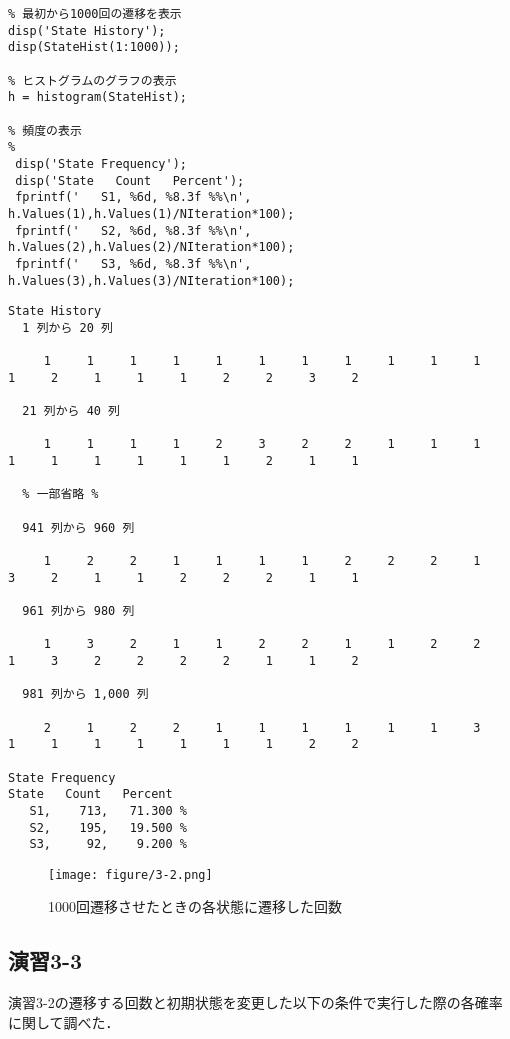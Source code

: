 \documentclass[documentclass]{jsarticle}
\begin{document}
\begin{lstlisting}[caption=1000回遷移させるためのプログラム]
%% Evaluation
% 最初から1000回の遷移を表示
disp('State History');
disp(StateHist(1:1000));

% ヒストグラムのグラフの表示
h = histogram(StateHist);

% 頻度の表示
%
 disp('State Frequency');
 disp('State   Count   Percent');
 fprintf('   S1, %6d, %8.3f %%\n', h.Values(1),h.Values(1)/NIteration*100);
 fprintf('   S2, %6d, %8.3f %%\n', h.Values(2),h.Values(2)/NIteration*100);
 fprintf('   S3, %6d, %8.3f %%\n', h.Values(3),h.Values(3)/NIteration*100);

\end{lstlisting}

\begin{lstlisting}[caption=ソースコード5を実行した際の結果]
  State History
  1 列から 20 列

     1     1     1     1     1     1     1     1     1     1     1     1     2     1     1     1     2     2     3     2

  21 列から 40 列

     1     1     1     1     2     3     2     2     1     1     1     1     1     1     1     1     1     2     1     1

  % 一部省略 %

  941 列から 960 列

     1     2     2     1     1     1     1     2     2     2     1     3     2     1     1     2     2     2     1     1

  961 列から 980 列

     1     3     2     1     1     2     2     1     1     2     2     1     3     2     2     2     2     1     1     2

  981 列から 1,000 列

     2     1     2     2     1     1     1     1     1     1     3     1     1     1     1     1     1     1     2     2

State Frequency
State   Count   Percent
   S1,    713,   71.300 %
   S2,    195,   19.500 %
   S3,     92,    9.200 %
\end{lstlisting}

\begin{figure}[H]
  \begin{center}
    \texttt{[image: figure/3-2.png]}
  \end{center}
  \caption{1000回遷移させたときの各状態に遷移した回数}
  \label{fig:3-2}
\end{figure}

\subsection*{演習3-3}
演習3-2の遷移する回数と初期状態を変更した以下の条件で実行した際の各確率に関して調べた．
\end{document}
